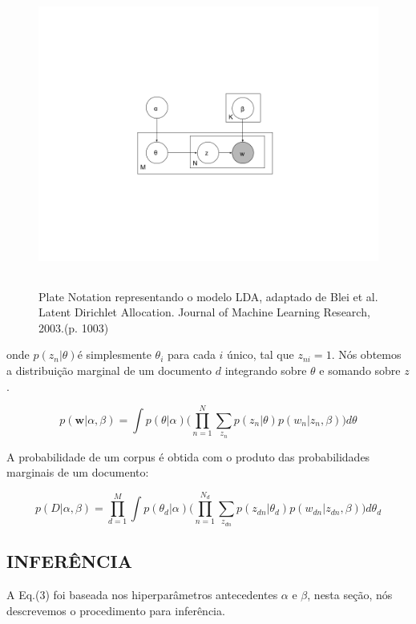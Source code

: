 \documentclass[12pt,a4paper]{article}
\begin{document}
  \begin{figure}[h]
    \centering
      \includegraphics[height=10cm]{images/figure_1.png}
      \caption{Plate Notation representando o modelo LDA, adaptado de Blei et al. Latent Dirichlet Allocation. Journal of Machine Learning Research, 2003.(p. 1003)}
  \end{figure}
  
  onde $p(z_n | \theta)$é simplesmente $\theta _i$ para cada $i$ único, tal que $z_{ni}=1$. Nós obtemos a distribuição marginal de um documento $d$ integrando sobre $\theta$ e somando sobre $z$.
  
  \begin{equation}
  p(\textbf{w}|\alpha,\beta)=\int{p(\theta|\alpha)\Bigg(\prod_{n=1}^{N}\sum_{z_n} p(z_n|\theta)p(w_n|z_n,\beta)\Bigg)d\theta}
  \end{equation}
  
  A probabilidade de um corpus é obtida com o produto das probabilidades marginais de um documento:
  
  \begin{equation}
  p(D|\alpha,\beta)= \prod_{d=1}^{M} \int{p(\theta _d|\alpha)\Bigg(\prod_{n=1}^{N_d}\sum_{z_{dn}} p(z_{dn}|\theta _d)p(w_{dn}|z_{dn},\beta)\Bigg)d\theta _d}
  \end{equation}
  
  \subsection{INFERÊNCIA}
  
  A Eq.(3) foi baseada nos hiperparâmetros antecedentes $\alpha$ e $\beta$, nesta seção, nós descrevemos o procedimento para inferência.
  
\end{document}
